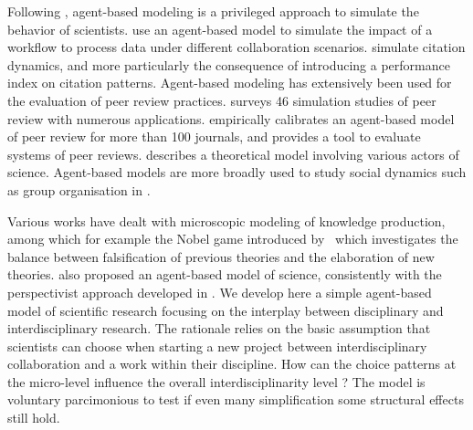 \documentclass[utf8,11pt]{article}
\begin{document}

Following \cite{giere2010agent}, agent-based modeling is a privileged approach to simulate the behavior of scientists. \cite{shafiee2019agent} use an agent-based model to simulate the impact of a workflow to process data under different collaboration scenarios. \cite{doi10.1162qssa00008} simulate citation dynamics, and more particularly the consequence of introducing a performance index on citation patterns. Agent-based modeling has extensively been used for the evaluation of peer review practices. \cite{feliciani2019scoping} surveys 46 simulation studies of peer review with numerous applications. \cite{kovanis2016complex} empirically calibrates an agent-based model of peer review for more than 100 journals, and provides a tool to evaluate systems of peer reviews. \cite{shneiderman2018twin} describes a theoretical model involving various actors of science. Agent-based models are more broadly used to study social dynamics such as group organisation in \cite{dionne2019diversity}.


Various works have dealt with microscopic modeling of knowledge production, among which for example the Nobel game introduced by~\cite{chavalarias2016s} which investigates the balance between falsification of previous theories and the elaboration of new theories. \cite{giere2010agent} also proposed an agent-based model of science, consistently with the perspectivist approach developed in \cite{giere2010scientific}. We develop here a simple agent-based model of scientific research focusing on the interplay between disciplinary and interdisciplinary research. The rationale relies on the basic assumption that scientists can choose when starting a new project between interdisciplinary collaboration and a work within their discipline. How can the choice patterns at the micro-level influence the overall interdisciplinarity level ? The model is voluntary parcimonious to test if even many simplification some structural effects still hold.
\end{document}
